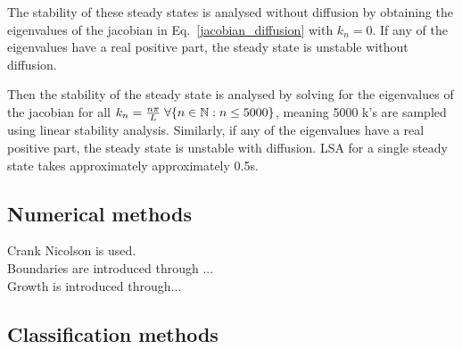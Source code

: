 The stability of these steady states is analysed without diffusion by obtaining the eigenvalues of the jacobian in Eq.~\ref{jacobian_diffusion} with $k_{n}=0$.
If any of the eigenvalues have a real positive part, the steady state is unstable without diffusion.

Then the stability of the steady state is analysed by solving for the eigenvalues of the jacobian for all $k_{n}=\frac{n\pi}{L} \hspace{0.1cm}\forall \{n \in \mathbb{N} : n \leq 5000\} $, meaning 5000 k's are sampled using linear stability analysis. Similarly, if any of the eigenvalues have a real positive part, the steady state is unstable with diffusion. LSA for a single steady state takes approximately approximately 0.5s.

\subsection{Numerical methods}
Crank Nicolson is used.\\
Boundaries are introduced through ...\\
Growth is introduced through...\\



\subsection*{Classification methods}



